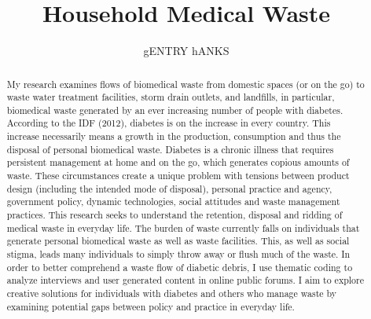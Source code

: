 \documentclass[12pt]{article}
\title{Household Medical Waste}
\author{gENTRY hANKS}
\begin{document}
\maketitle

\newpage
\begin{abstract}
\doublespacing 
My research examines flows of biomedical waste from domestic spaces (or on the go) to waste water treatment facilities, storm drain outlets, and landfills, in particular, biomedical waste generated by an ever increasing number of people with diabetes. According to the IDF (2012), diabetes is on the increase in every country. This increase necessarily means a growth in the production, consumption and thus the disposal of personal biomedical waste. Diabetes is a chronic illness that requires persistent management at home and on the go, which generates copious amounts of waste. These circumstances create a unique problem with tensions between product design (including the intended mode of disposal), personal practice and agency, government policy, dynamic technologies, social attitudes and waste management practices. This research seeks to understand the retention, disposal and ridding of medical waste in everyday life. The burden of waste currently falls on individuals that generate personal biomedical waste as well as waste facilities.  This, as well as social stigma, leads many individuals to simply throw away or flush much of the waste.  In order to better comprehend a waste flow of diabetic debris, I use thematic coding to analyze interviews and user generated content in online public forums. I aim to explore creative solutions for individuals with diabetes and others who manage waste by examining potential gaps between policy and practice in everyday life.

\end{abstract}


\newpage
\end{document}
